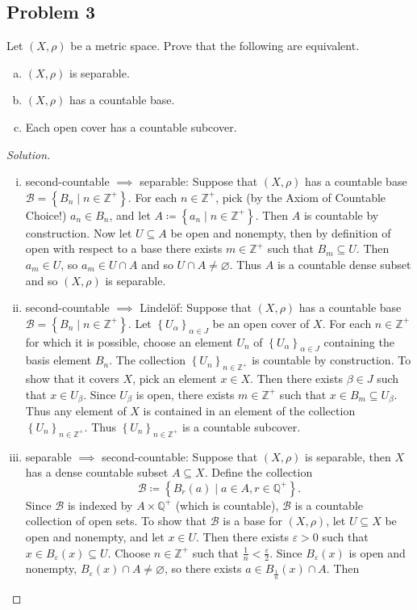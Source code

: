\documentclass[12pt]{article}
\newcommand{\z}{\mathbb{Z}}
\newcommand{\q}{\mathbb{Q}}
\newcommand\setb[1]{\left \{ #1 \right \}}
\newcommand{\eps}{\varepsilon}
\theoremstyle{definition}
\begin{document}
\subsection{Problem 3}
Let $(X,\rho)$ be a metric space. Prove that the following are equivalent.
\begin{enumerate}[(a)]
    \item $(X,\rho)$ is separable.
    \item $(X,\rho)$ has a countable base.
    \item Each open cover has a countable subcover.
\end{enumerate}
\begin{proof}[Solution]
    \noindent
    \begin{enumerate}[(i)]
        \item second-countable $\implies$ separable: Suppose that $(X,\rho)$ has a countable base $\mathcal{B} = \setb{ B_n \mid n \in \z^+ }$. For each $n \in \z^+$, pick (by the Axiom of Countable Choice!) $a_n \in B_n$, and let $A \coloneqq \setb{ a_n \mid n \in \z^+ }$. Then $A$ is countable by construction. Now let $U \subseteq A$ be open and nonempty, then by definition of open with respect to a base there exists $m \in \z^+$ such that $B_m \subseteq U$. Then $a_m \in U$, so $a_m \in U \cap A$ and so $U \cap A \neq \varnothing$. Thus $A$ is a countable dense subset and so $(X,\rho)$ is separable.
        \item second-countable $\implies$ Lindel\"of: Suppose that $(X,\rho)$ has a countable base $\mathcal{B} = \setb{ B_n \mid n \in \z^+ }$. Let $\setb{ U_{\alpha} }_{\alpha \in J}$ be an open cover of $X$. For each $n \in \z^+$ for which it is possible, choose an element $U_n$ of $\setb{ U_{\alpha} }_{\alpha \in J}$ containing the basis element $B_n$. The collection $\setb{ U_n }_{n \in \z^+}$ is countable by construction. To show that it covers $X$, pick an element $x \in X$. Then there exists $\beta \in J$ such that $x \in U_{\beta}$. Since $U_{\beta}$ is open, there exists $m \in \z^+$ such that $x \in B_m \subseteq U_{\beta}$. Thus any element of $X$ is contained in an element of the collection $\setb{ U_n }_{n \in \z^+}$. Thus $\setb{ U_n }_{n \in \z^+}$ is a countable subcover.
        \item separable $\implies$ second-countable: Suppose that $(X,\rho)$ is separable, then $X$ has a dense countable subset $A \subseteq X$. Define the collection 
        \[
            \mathcal{B} \coloneqq \setb{ B_r(a) \mid a \in A, r \in \q^+ }.
        \]
        Since $\mathcal{B}$ is indexed by $A \times \q^+$ (which is countable), $\mathcal{B}$ is a countable collection of open sets. To show that $\mathcal{B}$ is a base for $(X,\rho)$, let $U \subseteq X$ be open and nonempty, and let $x \in U$. Then there exists $\eps > 0$ such that $x \in B_{\eps}(x) \subseteq U$. Choose $n \in \z^+$ such that $\frac{1}{n} < \frac{\eps}{2}$. Since $B_{\eps}(x)$ is open and nonempty, $B_{\eps}(x) \cap A \neq \varnothing$, so there exists $a \in B_{\frac{1}{n}}(x) \cap A$. Then 

\end{enumerate}
\end{proof}
\end{document}
